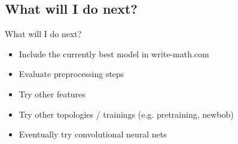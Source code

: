 \subsection{What will I do next?}
\begin{frame}{What will I do next?}
    \begin{itemize}
        \item Include the currently best model in write-math.com
        \item Evaluate preprocessing steps
        \item Try other features
        \item Try other topologies / trainings (e.g. pretraining, newbob)
        \item Eventually try convolutional neural nets
    \end{itemize}
\end{frame}

